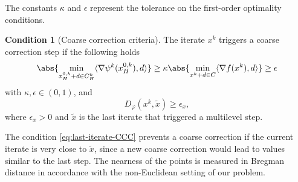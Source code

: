 \documentclass[11pt,reqno]{amsart}
\numberwithin{equation}{section}
\numberwithin{figure}{section}
\theoremstyle{plain}
\theoremstyle{definition}
\newtheorem{condition}[theorem]{Condition}
\newcommand{\la}{\langle}
\newcommand{\ra}{\rangle}
\newcommand{\vphi}{\varphi}
\newcommand{\df}{\nabla f}
\begin{document}
The constants $\kappa$ and $\epsilon$ represent the tolerance on the first-order optimality conditions.
\begin{condition}[Coarse correction criteria]
    The iterate $x^k$ triggers a coarse correction step if the following holds
    \begin{equation}\label{eq:constrained-CCC}
        \abs{ \min_{x_H^{0,k} + d \in C^k_{H}} \la \nabla \psi^k(x_H^{0,k}), d \ra} \geq \kappa \abs{\min_{x^k + d \in C} \la \df(x^k), d \ra} \geq \epsilon
    \end{equation}
    with $\kappa, \epsilon \in (0,1)$, and
    \begin{equation} \label{eq:last-iterate-CCC}
        D_\vphi(x^k ,\widetilde{x}) \geq \epsilon_x,
    \end{equation}
    where $\epsilon_x > 0$ and $\widetilde{x}$ is the last iterate that triggered a multilevel step. 
\end{condition}

The condition \eqref{eq:last-iterate-CCC} prevents a coarse correction if the current iterate is very close to $\widetilde{x}$, since a new coarse correction would lead to values similar to the last step. The nearness of the points is measured in Bregman distance in accordance with the non-Euclidean setting of our problem. 
\end{document}
